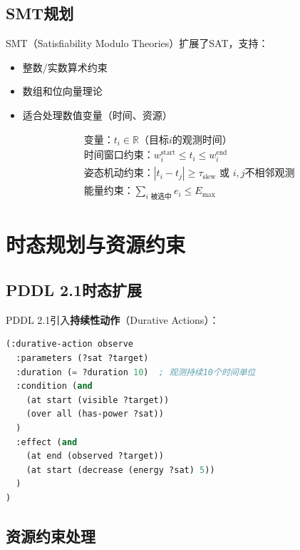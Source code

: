 \subsection{SMT规划}

SMT（Satisfiability Modulo Theories）扩展了SAT，支持：
\begin{itemize}[leftmargin=2em]
  \item 整数/实数算术约束
  \item 数组和位向量理论
  \item 适合处理数值变量（时间、资源）
\end{itemize}

\begin{example}
\begin{align*}
& \text{变量：} t_i \in \mathbb{R} \text{（目标}i\text{的观测时间）} \\
& \text{时间窗口约束：} w_i^{\text{start}} \leq t_i \leq w_i^{\text{end}} \\
& \text{姿态机动约束：} |t_i - t_j| \geq \tau_{\text{slew}} \text{ 或 } i,j\text{不相邻观测} \\
& \text{能量约束：} \sum_{i \text{ 被选中}} e_i \leq E_{\text{max}}
\end{align*}
\end{example}

\section{时态规划与资源约束}

\subsection{PDDL 2.1时态扩展}

PDDL 2.1引入\textbf{持续性动作}（Durative Actions）：

\begin{lstlisting}[language=Lisp,caption=持续性动作示例]
(:durative-action observe
  :parameters (?sat ?target)
  :duration (= ?duration 10)  ; 观测持续10个时间单位
  :condition (and
    (at start (visible ?target))
    (over all (has-power ?sat))
  )
  :effect (and
    (at end (observed ?target))
    (at start (decrease (energy ?sat) 5))
  )
)
\end{lstlisting}

\subsection{资源约束处理}

